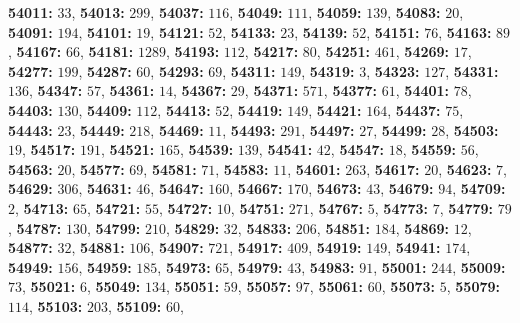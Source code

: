 \textsf{\bfseries 54011:} $33$, \textsf{\bfseries 54013:} $299$, \textsf{\bfseries 54037:} $116$, \textsf{\bfseries 54049:} $111$, \textsf{\bfseries 54059:} $139$, \textsf{\bfseries 54083:} $20$, \textsf{\bfseries 54091:} $194$, \textsf{\bfseries 54101:} $19$, \textsf{\bfseries 54121:} $52$, \textsf{\bfseries 54133:} $23$, \textsf{\bfseries 54139:} $52$, \textsf{\bfseries 54151:} $76$, \textsf{\bfseries 54163:} $89$, \textsf{\bfseries 54167:} $66$, \textsf{\bfseries 54181:} $1289$, \textsf{\bfseries 54193:} $112$, \textsf{\bfseries 54217:} $80$, \textsf{\bfseries 54251:} $461$, \textsf{\bfseries 54269:} $17$, \textsf{\bfseries 54277:} $199$, \textsf{\bfseries 54287:} $60$, \textsf{\bfseries 54293:} $69$, \textsf{\bfseries 54311:} $149$, \textsf{\bfseries 54319:} $3$, \textsf{\bfseries 54323:} $127$, \textsf{\bfseries 54331:} $136$, \textsf{\bfseries 54347:} $57$, \textsf{\bfseries 54361:} $14$, \textsf{\bfseries 54367:} $29$, \textsf{\bfseries 54371:} $571$, \textsf{\bfseries 54377:} $61$, \textsf{\bfseries 54401:} $78$, \textsf{\bfseries 54403:} $130$, \textsf{\bfseries 54409:} $112$, \textsf{\bfseries 54413:} $52$, \textsf{\bfseries 54419:} $149$, \textsf{\bfseries 54421:} $164$, \textsf{\bfseries 54437:} $75$, \textsf{\bfseries 54443:} $23$, \textsf{\bfseries 54449:} $218$, \textsf{\bfseries 54469:} $11$, \textsf{\bfseries 54493:} $291$, \textsf{\bfseries 54497:} $27$, \textsf{\bfseries 54499:} $28$, \textsf{\bfseries 54503:} $19$, \textsf{\bfseries 54517:} $191$, \textsf{\bfseries 54521:} $165$, \textsf{\bfseries 54539:} $139$, \textsf{\bfseries 54541:} $42$, \textsf{\bfseries 54547:} $18$, \textsf{\bfseries 54559:} $56$, \textsf{\bfseries 54563:} $20$, \textsf{\bfseries 54577:} $69$, \textsf{\bfseries 54581:} $71$, \textsf{\bfseries 54583:} $11$, \textsf{\bfseries 54601:} $263$, \textsf{\bfseries 54617:} $20$, \textsf{\bfseries 54623:} $7$, \textsf{\bfseries 54629:} $306$, \textsf{\bfseries 54631:} $46$, \textsf{\bfseries 54647:} $160$, \textsf{\bfseries 54667:} $170$, \textsf{\bfseries 54673:} $43$, \textsf{\bfseries 54679:} $94$, \textsf{\bfseries 54709:} $2$, \textsf{\bfseries 54713:} $65$, \textsf{\bfseries 54721:} $55$, \textsf{\bfseries 54727:} $10$, \textsf{\bfseries 54751:} $271$, \textsf{\bfseries 54767:} $5$, \textsf{\bfseries 54773:} $7$, \textsf{\bfseries 54779:} $79$, \textsf{\bfseries 54787:} $130$, \textsf{\bfseries 54799:} $210$, \textsf{\bfseries 54829:} $32$, \textsf{\bfseries 54833:} $206$, \textsf{\bfseries 54851:} $184$, \textsf{\bfseries 54869:} $12$, \textsf{\bfseries 54877:} $32$, \textsf{\bfseries 54881:} $106$, \textsf{\bfseries 54907:} $721$, \textsf{\bfseries 54917:} $409$, \textsf{\bfseries 54919:} $149$, \textsf{\bfseries 54941:} $174$, \textsf{\bfseries 54949:} $156$, \textsf{\bfseries 54959:} $185$, \textsf{\bfseries 54973:} $65$, \textsf{\bfseries 54979:} $43$, \textsf{\bfseries 54983:} $91$, \textsf{\bfseries 55001:} $244$, \textsf{\bfseries 55009:} $73$, \textsf{\bfseries 55021:} $6$, \textsf{\bfseries 55049:} $134$, \textsf{\bfseries 55051:} $59$, \textsf{\bfseries 55057:} $97$, \textsf{\bfseries 55061:} $60$, \textsf{\bfseries 55073:} $5$, \textsf{\bfseries 55079:} $114$, \textsf{\bfseries 55103:} $203$, \textsf{\bfseries 55109:} $60$, 
